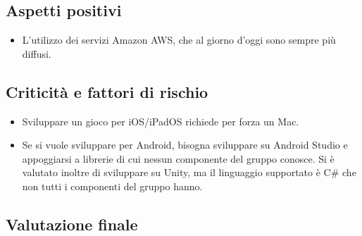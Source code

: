 \subsection{Aspetti positivi}
\begin{itemize}
\item L'utilizzo dei servizi Amazon AWS, che al giorno d'oggi sono sempre più diffusi.
\end{itemize}

\subsection{Criticità e fattori di rischio}
\begin{itemize}
\item Sviluppare un gioco per iOS/iPadOS richiede per forza un Mac.
\item Se si vuole sviluppare per Android, bisogna sviluppare su Android Studio e appoggiarsi a librerie di cui nessun componente del gruppo conosce. 
Si è valutato inoltre di sviluppare su Unity, ma il linguaggio supportato è C\# che non tutti i componenti del gruppo hanno.
\end{itemize}

\subsection{Valutazione finale}